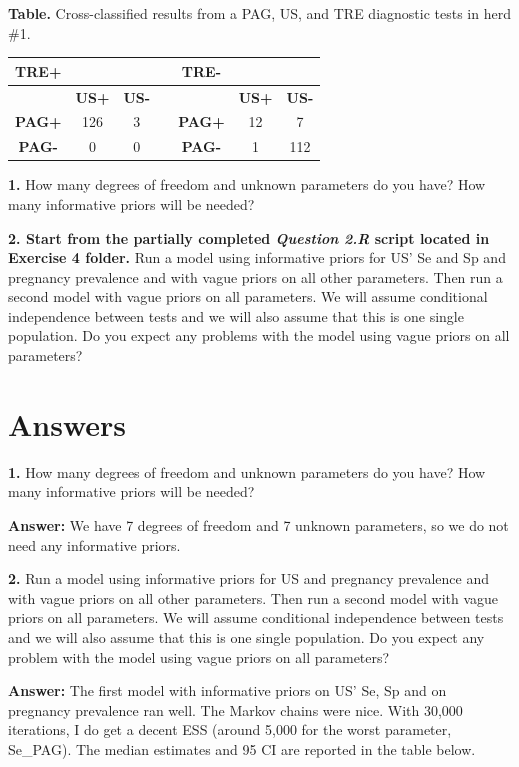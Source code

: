 \documentclass[
]{book}
\begin{document}
\textbf{Table.} Cross-classified results from a PAG, US, and TRE diagnostic tests in herd \#1.

\begin{longtable}[]{@{}ccccccc@{}}
\toprule\noalign{}
\textbf{TRE+} & & & & \textbf{TRE-} & & \\
\midrule\noalign{}
\endhead
\bottomrule\noalign{}
\endlastfoot
& \textbf{US+} & \textbf{US-} & & & \textbf{US+} & \textbf{US-} \\
\textbf{PAG+} & 126 & 3 & & \textbf{PAG+} & 12 & 7 \\
\textbf{PAG-} & 0 & 0 & & \textbf{PAG-} & 1 & 112 \\
\end{longtable}

\textbf{1.} How many degrees of freedom and unknown parameters do you have? How many informative priors will be needed?

\textbf{2. Start from the partially completed \emph{Question 2.R} script located in Exercise 4 folder.} Run a model using informative priors for US' Se and Sp and pregnancy prevalence and with vague priors on all other parameters. Then run a second model with vague priors on all parameters. We will assume conditional independence between tests and we will also assume that this is one single population. Do you expect any problems with the model using vague priors on all parameters?

\section{Answers}\label{answers-3}

\textbf{1.} How many degrees of freedom and unknown parameters do you have? How many informative priors will be needed?

\textbf{Answer:} We have 7 degrees of freedom and 7 unknown parameters, so we do not need any informative priors.

\textbf{2.} Run a model using informative priors for US and pregnancy prevalence and with vague priors on all other parameters. Then run a second model with vague priors on all parameters. We will assume conditional independence between tests and we will also assume that this is one single population. Do you expect any problem with the model using vague priors on all parameters?

\textbf{Answer:} The first model with informative priors on US' Se, Sp and on pregnancy prevalence ran well. The Markov chains were nice. With 30,000 iterations, I do get a decent ESS (around 5,000 for the worst parameter, Se\_PAG). The median estimates and 95 CI are reported in the table below.
\end{document}
